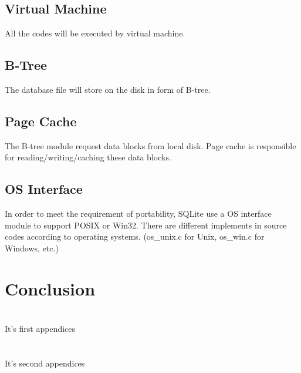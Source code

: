 \documentclass[journal]{IEEEtran}
\begin{document}
\subsection{Virtual Machine}
All the codes will be executed by virtual machine.

\subsection{B-Tree}
The database file will store on the disk in form of B-tree.

\subsection{Page Cache}
The B-tree module request data blocks from local disk. Page cache is responsible for reading/writing/caching these data blocks.

\subsection{OS Interface}
In order to meet the requirement of portability, SQLite use a OS interface module to support POSIX or Win32. There are different implements in source codes according to operating systems. (os\_unix.c for Unix, os\_win.c for Windows, etc.)


\section{Conclusion}

\appendices
\section{}
It's first appendices
        
\section{}
It's second appendices

    
\end{document}
